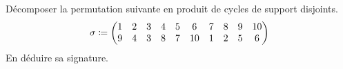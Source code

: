 \documentclass{magnolia}
\begin{document}

Décomposer la permutation suivante en produit de cycles de support
disjoints.
$$\sigma\coloneqq
\begin{pmatrix}
1&2&3&4&5&6&7&8&9&10\\
9&4&3&8&7&10&1&2&5&6 
\end{pmatrix}
$$
En déduire sa signature.
\end{document}
